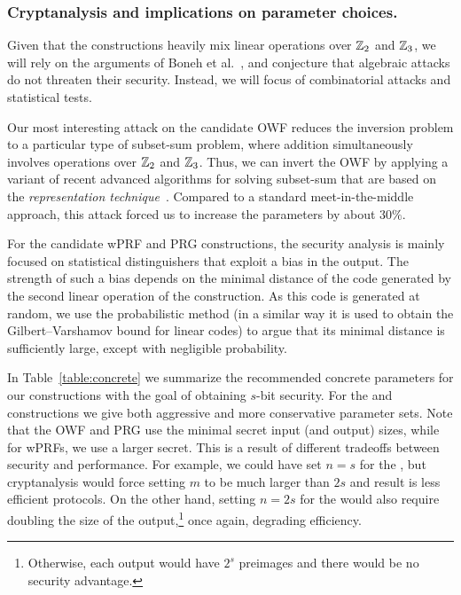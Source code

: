 \begin{itemize}
\end{itemize}

\subsubsection{Cryptanalysis and implications on parameter choices.}
Given that the constructions heavily mix linear operations over $\mathbb{Z}_2$ and $\mathbb{Z}_3$,
we will rely on the arguments of Boneh et al.~\cite{boneh2018-darkmatter},
and conjecture that algebraic attacks do not threaten their security.
Instead, we will focus of combinatorial attacks and statistical tests.

Our most interesting attack on the
candidate OWF reduces the inversion problem to a particular type of subset-sum problem,
where addition simultaneously involves operations over $\mathbb{Z}_2$ and $\mathbb{Z}_3$.
Thus, we can invert the OWF by applying a variant of recent advanced algorithms
for solving subset-sum that are based on the
\emph{representation technique}~\cite{Howgrave-GrahamJ10,BeckerCJ11,BonnetainBSS20}.
Compared to a standard meet-in-the-middle approach,
this attack forced us to increase the parameters by about $30\%$.

For the candidate wPRF and PRG constructions,
the security analysis is mainly focused on
statistical distinguishers that exploit a bias in the output.
The strength of such a bias depends on the minimal distance of the
code generated by the second linear operation of the construction.
As this code is generated at random, we use the probabilistic method
(in a similar way it is used to obtain the Gilbert–Varshamov bound for linear codes)
to argue that its minimal distance is sufficiently large, except with negligible probability.


In Table~\ref{table:concrete} we summarize the recommended
concrete parameters for our constructions 
with the goal of obtaining $s$-bit security. For the \ttOWF and \ttwPRF constructions
we give both aggressive and more conservative parameter sets.
Note that the OWF and PRG use the minimal secret input (and output)
sizes, while for wPRFs, we use a larger secret. 
This is a result of different tradeoffs between security and performance.
For example, we could have set $n = s$ for the \ttwPRF, but cryptanalysis would
force setting $m$ to be much larger than $2s$ and result is less efficient protocols.
On the other hand, setting $n = 2s$ for the \ttOWF would also require 
doubling the size of the output,\footnote{
Otherwise, each output would have $2^s$ preimages and there would be no security advantage.}
once again, degrading efficiency.

